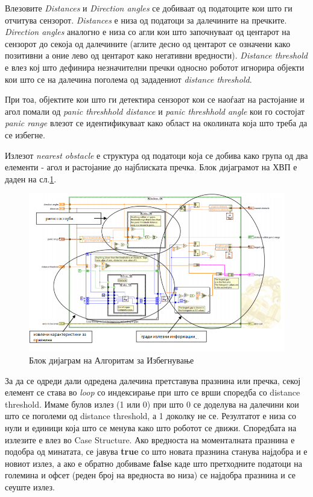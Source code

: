 \documentclass[11pt]{article}
\begin{document}
  Влезовите \textit{Distances} и \textit{Direction angles} се добиваат од податоците кои што ги отчитува сензорот. \textit{Distances} е низа од податоци за далечините на пречките. \textit{Direction angles} аналогно е низа со агли кои што започнуваат од центарот на сензорот до секоја од далечините (аглите десно од центарот се означени како позитивни а оние лево од центарот како негативни вредности). \textit{Distance threshold} е влез кој што дефинира незначителни пречки односно роботот игнорира објекти кои што се на далечина поголема од зададениот \textit{distance threshold}.

  При тоа, објектите кои што ги детектира сензорот кои се наоѓаат на растојание и агол помали од \textit{panic threshhold distance} и \textit{panic threshhold angle} кои го состојат \textit{panic range} влезот се идентификуваат како област на околината која што треба да се избегне.

  Излезот \textit{nearest obstacle} е структура од податоци која се добива како група од два елементи - агол и растојание до најблиската пречка. Блок дијаграмот на ХВП е даден на сл.\ref{fig:vfh_block_diagram.png}.

  \begin{figure}[H]
    \includegraphics[width=0.75\linewidth]{vfh_block_diagram.png}
    \centering
    \caption{Блок дијаграм на Алгоритам за Избегнување}
    \label{fig:vfh_block_diagram.png}
    \end{figure}

  За да се одреди дали одредена далечина претставува празнина или пречка, секој елемент се става во \textit{loop} со индексирање при што се врши споредба со distance threshold. Имаме булов излез (1 или 0) при што 0 се доделува на далечини кои што се поголеми од distance threshold, а 1 доколку не се. Резултатот е низа со нули и единици која што се менува како што роботот се движи. Споредбата на излезите е влез во Case Structure. Ако вредноста на моменталната празнина е подобра од минатата, се јавува \textbf{true} со што новата празнина станува најдобра и е новиот излез, а ако е обратно добиваме \textbf{false} каде што претходните податоци на големина и офсет (реден број на вредноста во низа) се најдобра празнина и се сеуште излез.
\end{document}
